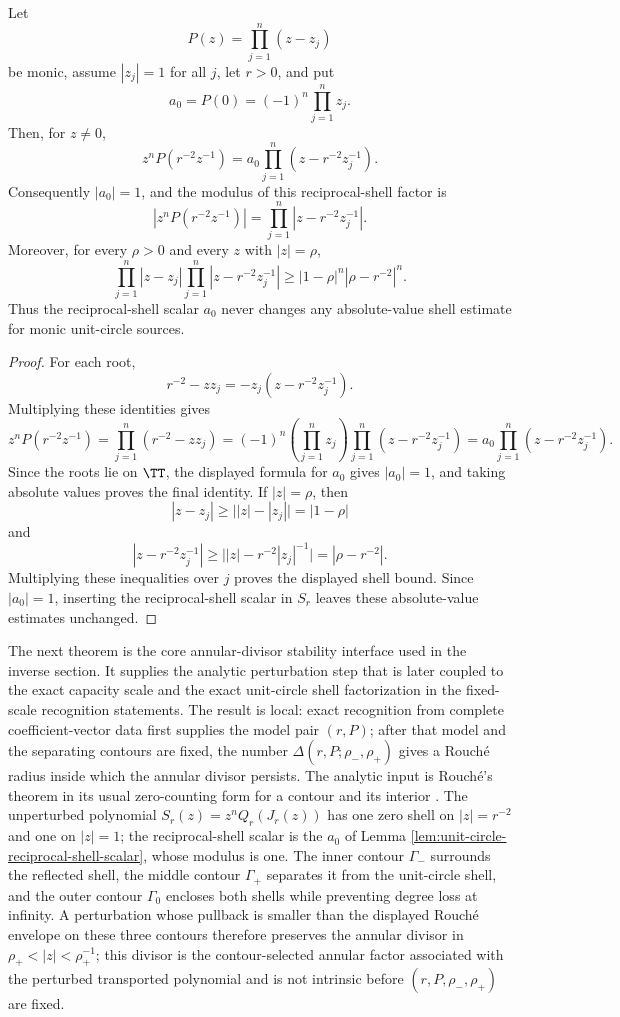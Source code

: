 \begin{lemma}\label{lem:unit-circle-reciprocal-shell-scalar}
Let
\[
P(z)=\prod_{j=1}^{n}(z-z_j)
\]
be monic, assume \(|z_j|=1\) for all \(j\), let \(r>0\), and put
\[
a_0=P(0)=(-1)^n\prod_{j=1}^{n}z_j .
\]
Then, for \(z\ne0\),
\[
z^nP(r^{-2}z^{-1})
=a_0\prod_{j=1}^{n}(z-r^{-2}z_j^{-1}).
\]
Consequently \(|a_0|=1\), and the modulus of this reciprocal-shell
factor is
\[
\left|z^nP(r^{-2}z^{-1})\right|
=\prod_{j=1}^{n}|z-r^{-2}z_j^{-1}|.
\]
Moreover, for every \(\rho>0\) and every \(z\) with \(|z|=\rho\),
\[
\prod_{j=1}^{n}|z-z_j|
\prod_{j=1}^{n}|z-r^{-2}z_j^{-1}|
\ge |1-\rho|^n|\rho-r^{-2}|^n .
\]
Thus the reciprocal-shell scalar \(a_0\) never changes any
absolute-value shell estimate for monic unit-circle sources.
\end{lemma}

\begin{proof}
For each root,
\[
r^{-2}-zz_j=-z_j(z-r^{-2}z_j^{-1}).
\]
Multiplying these identities gives
\[
z^nP(r^{-2}z^{-1})
=\prod_{j=1}^{n}(r^{-2}-zz_j)
=(-1)^n\left(\prod_{j=1}^{n}z_j\right)
\prod_{j=1}^{n}(z-r^{-2}z_j^{-1})
=a_0\prod_{j=1}^{n}(z-r^{-2}z_j^{-1}).
\]
Since the roots lie on \(\TT\), the displayed formula for \(a_0\) gives
\(|a_0|=1\), and taking absolute values proves the final identity.
If \(|z|=\rho\), then
\[
|z-z_j|\ge \bigl||z|-|z_j|\bigr|=|1-\rho|
\]
and
\[
|z-r^{-2}z_j^{-1}|
\ge \bigl||z|-r^{-2}|z_j|^{-1}\bigr|
=|\rho-r^{-2}|.
\]
Multiplying these inequalities over \(j\) proves the displayed shell
bound.  Since \(|a_0|=1\), inserting the reciprocal-shell scalar in
\(S_r\) leaves these absolute-value estimates unchanged.
\end{proof}

The next theorem is the core annular-divisor stability interface used in the inverse section.  It supplies the analytic perturbation step that is later coupled to the exact capacity scale and the exact unit-circle shell factorization in the fixed-scale recognition statements.  The result is local: exact recognition from complete coefficient-vector data first supplies the model pair \((r,P)\); after that model and the separating contours are fixed, the number \(\Delta(r,P;\rho_-,\rho_+)\) gives a Rouch\'e radius inside which the annular divisor persists.  The analytic input is Rouch\'e's theorem in its usual zero-counting form for a contour and its interior \citep[pp.~152--153]{Ahlfors1979}.  The unperturbed polynomial
\(S_r(z)=z^nQ_r(J_r(z))\) has one zero shell on \(|z|=r^{-2}\) and one on \(|z|=1\); the reciprocal-shell scalar is the \(a_0\) of Lemma \ref{lem:unit-circle-reciprocal-shell-scalar}, whose modulus is one.  The inner contour \(\Gamma_-\) surrounds the reflected shell, the middle contour \(\Gamma_+\) separates it from the unit-circle shell, and the outer contour \(\Gamma_0\) encloses both shells while preventing degree loss at infinity.  A perturbation whose pullback is smaller than the displayed Rouch\'e envelope on these three contours therefore preserves the annular divisor in \(\rho_+<|z|<\rho_+^{-1}\); this divisor is the contour-selected annular factor associated with the perturbed transported polynomial and is not intrinsic before \((r,P,\rho_-,\rho_+)\) are fixed.

